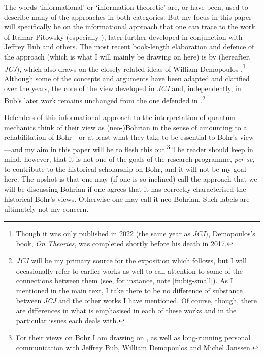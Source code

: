\documentclass[12pt,english,twoside]{article}
\numberwithin{equation}{section}
\begin{document}
The words `informational' or `information-theoretic' are, or have been, used to describe many of the approaches in both categories. But my focus in this paper will specifically be on the informational approach that one can trace to the work of Itamar Pitowsky (especially \citealt{pitowsky1989}), later further developed in conjunction with Jeffrey Bub \citep[]{bub-pitowsky2010, bub2016, bub2017, bub2018a, bubRedux, bub2021} and others. The most recent book-length elaboration and defence of the approach (which is what I will mainly be drawing on here) is by \citet*[]{3m2020} (hereafter, \emph{JCJ}), which also draws on the closely related ideas of William Demopoulos \citeyearpar{demopoulosOnTheories}.\footnote{Though it was only published in 2022 (the same year as \emph{JCJ}), Demopoulos's book, \emph{On Theories}, was completed shortly before his death in 2017.} Although some of the concepts and arguments have been adapted and clarified over the years, the core of the view developed in \emph{JCJ} and, independently, in Bub's later work remains unchanged from the one defended in \citet[]{bub-pitowsky2010}.\footnote{\emph{JCJ} will be my primary source for the exposition which follows, but I will occasionally refer to earlier works as well to call attention to some of the connections between them (see, for instance, note \ref{fn:big-small}). As I mentioned in the main text, I take there to be no difference of substance between \emph{JCJ} and the other works I have mentioned. Of course, though, there are differences in what is emphasised in each of these works and in the particular issues each deals with.}

Defenders of this informational approach to the interpretation of quantum mechanics think of their view as (neo-)Bohrian in the sense of amounting to a rehabilitation of Bohr---or at least what they take to be essential to Bohr's view---and my aim in this paper will be to flesh this out.\footnote{For their views on Bohr I am drawing on \citet[]{bub2017, cuffaro2010, cuffaro2018d, cuffaroPerovicReview, demopoulosOnTheories}, as well as long-running personal communication with Jeffrey Bub, William Demopoulos and Michel Janssen.} The reader should keep in mind, however, that it is not one of the goals of the research programme, \emph{per se}, to contribute to the historical scholarship on Bohr, and it will not be my goal here. The upshot is that one may (if one is so inclined) call the approach that we will be discussing Bohrian if one agrees that it has correctly characterised the historical Bohr's views. Otherwise one may call it neo-Bohrian. Such labels are ultimately not my concern.
\end{document}
